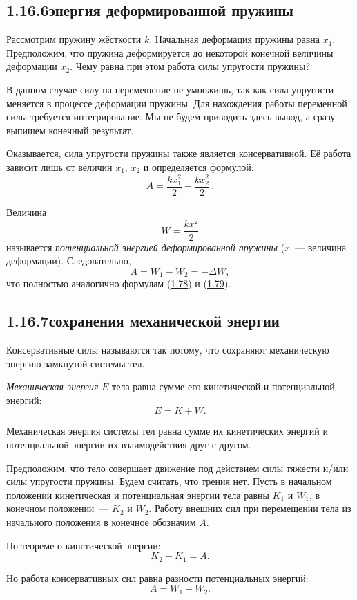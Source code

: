 \subsection*{1.16.6 энергия деформированной пружины}
\noindent Рассмотрим пружину жёсткости $k$. Начальная деформация пружины равна $x_1$. Предположим, что пружина деформируется до некоторой конечной величины деформации $x_2$. Чему равна при этом работа силы упру\-гости пружины?

В данном случае силу на перемещение не умножишь, так как сила упру\-гости ме\-няется в процессе деформации пружины. Для нахождения работы переменной силы требуется интегри\-рование. Мы не будем приводить здесь вывод, а сразу выпишем конечный результат.

Оказывается, сила упру\-гости пружины также является консервативной. Её работа зависит лишь от величин $x_1$, $x_2$ и определяется формулой:
\[
A=\frac{kx_1^2}{2}-\frac{kx_2^2}{2}\,.
\]

Величина
\[
W=\frac{kx^2}{2}
\]
\noindent называется \textit{потенциаль\-ной энергией деформированной пружины} ($x$~--- величина деформации). Следовательно,
\[
A=W_1-W_2=-\Delta W,
\]
\noindent что полностью аналогично формулам (\hyperlink{eq178}{1.78}) и (\hyperlink{eq179}{1.79}).
\newpage
\subsection*{1.16.7 сохране\-ния механи\-ческой энер\-гии}
\noindent Консервативные силы называются так потому, что сохраняют механическую энергию замкну\-той си\-стемы тел.

\textit{Механическая энергия} $E$ тела равна сумме его кинетической и потенциаль\-ной энергий:
\[
E=K+W.
\]

Механическая энергия си\-стемы тел равна сумме их кинетических энергий и потенциаль\-ной энер\-гии их взаимодействия друг с другом.

Предположим, что тело совершает движение под действием силы тяже\-сти и/или силы упру\-гости пружины. Будем считать, что трения нет. Пусть в начальном положении кинетическая и потенциаль\-ная энер\-гии тела равны $K_1$ и $W_1$, в конечном положении~--- $K_2$ и $W_2$. Работу внешних сил при перемещении тела из начального положения в конечное обозначим $A$.

По теореме о кинетической энер\-гии:
\[
K_2-K_1=A.
\]

Но работа консервативных сил равна разности потенциальных энергий:
\[
A=W_1-W_2.
\]

